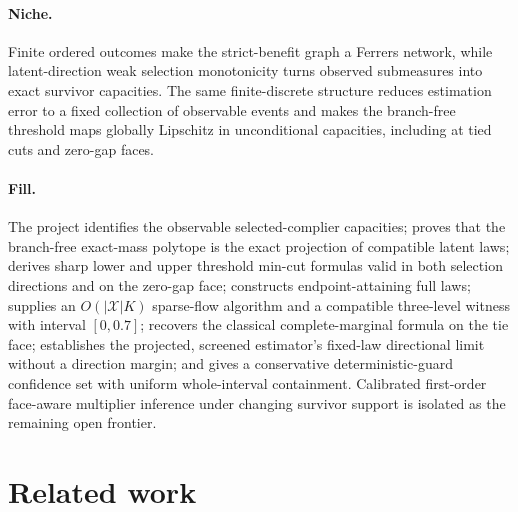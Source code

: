 \documentclass{article}
\begin{document}
\paragraph{Niche.} Finite ordered outcomes make the strict-benefit graph a Ferrers network, while latent-direction weak selection monotonicity turns observed submeasures into exact survivor capacities. The same finite-discrete structure reduces estimation error to a fixed collection of observable events and makes the branch-free threshold maps globally Lipschitz in unconditional capacities, including at tied cuts and zero-gap faces.

\paragraph{Fill.} The project identifies the observable selected-complier capacities; proves that the branch-free exact-mass polytope is the exact projection of compatible latent laws; derives sharp lower and upper threshold min-cut formulas valid in both selection directions and on the zero-gap face; constructs endpoint-attaining full laws; supplies an \(O(|\mathcal X|K)\) sparse-flow algorithm and a compatible three-level witness with interval \([0,0.7]\); recovers the classical complete-marginal formula on the tie face; establishes the projected, screened estimator's fixed-law directional limit without a direction margin; and gives a conservative deterministic-guard confidence set with uniform whole-interval containment. Calibrated first-order face-aware multiplier inference under changing survivor support is isolated as the remaining open frontier.

\section{Related work}
\end{document}
